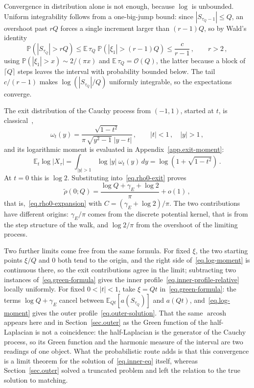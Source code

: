 \documentclass[11pt,a4paper]{article}
\theoremstyle{definition}
\begin{document}
Convergence in distribution alone is not enough, because $\log$ is unbounded.
Uniform integrability follows from a one-big-jump bound: since
$|S_{\tau_Q - 1}| \leq Q$, an overshoot past $rQ$ forces a single increment
larger than $(r-1)Q$, so by Wald's identity
\begin{equation}\label{eq.overshoot-tail}
  \mathbb{P} \left(|S_{\tau_Q}| > rQ\right)
  \leq \mathbb{E}\,\tau_Q \;\mathbb{P} \left(|\xi_1| > (r-1)Q\right)
  \leq \frac{c}{r-1}\,,
  \qquad r > 2\,,
\end{equation}
using $\mathbb{P}(|\xi_1|>x) \sim 2/(\pi x)$ and $\mathbb{E}\,\tau_Q =
\mathcal O(Q)$, the latter because a block of $\lceil Q\rceil$ steps leaves the
interval with probability bounded below.  The tail $c/(r-1)$ makes
$\log(|S_{\tau_Q}|/Q)$ uniformly integrable, so the expectations converge.

The exit distribution of the Cauchy process from $(-1,1)$, started at $t$, is
classical~\cite{BanuelosKulczycki2004, KulczyckiKwasnickiMaleckiStos2010},
\begin{equation}\label{eq.poisson-kernel}
  \omega_t(y) = \frac{\sqrt{1-t^2}}
    {\pi\,\sqrt{y^2-1}\;|y-t|}\,,
  \qquad |t|<1\,,\quad |y|>1\,,
\end{equation}
and its logarithmic moment is evaluated in
Appendix~\ref{app.exit-moment}:
\begin{equation}\label{eq.log-moment}
  \mathbb{E}_t\log|X_\tau|
  = \int_{|y|>1}\log|y|\;\omega_t(y)\,dy
  = \log \left(1+\sqrt{1-t^2}\right)\,.
\end{equation}
At $t = 0$ this is $\log 2$.  Substituting into~\eqref{eq.rho0-exit} proves
\begin{equation}\label{eq.C-result}
  \tilde\rho(0;Q) = \frac{\log Q + \gamma_E + \log 2}{\pi} + o(1)\,,
\end{equation}
that is,~\eqref{eq.rho0-expansion} with $C = (\gamma_E + \log 2)/\pi$.  The two
contributions have different origins:
$\gamma_E/\pi$ comes from the discrete potential kernel, that is from the
step structure of the walk, and $\log 2/\pi$ from the overshoot of the limiting
process.

Two further limits come free from the same formula.  For fixed $\xi$, the two
starting points $\xi/Q$ and $0$ both tend to the origin, and the right side
of~\eqref{eq.log-moment} is continuous there, so the exit contributions agree in
the limit; subtracting two instances of~\eqref{eq.green-formula} gives the inner
profile~\eqref{eq.inner-profile-relative} locally uniformly.  For fixed
$0<|t|<1$, take
$\xi = Qt$ in~\eqref{eq.green-formula}: the terms $\log Q + \gamma_E$ cancel
between $\mathbb{E}_{Qt}[a(S_{\tau_Q})]$ and $a(Qt)$, and~\eqref{eq.log-moment}
gives the outer profile~\eqref{eq.outer-solution}.  That the same
$\operatorname{arcosh}$ appears here and in Section~\ref{sec.outer} as the Green
function of the half-Laplacian is not a coincidence: the half-Laplacian is the
generator of the Cauchy process, so its Green function and the harmonic measure
of the interval are two readings of one object.  What the probabilistic route
adds is that this convergence is a limit theorem for the solution
of~\eqref{eq.inner-eq} itself, whereas Section~\ref{sec.outer} solved a
truncated problem and left the relation to the true solution to matching.
\end{document}
